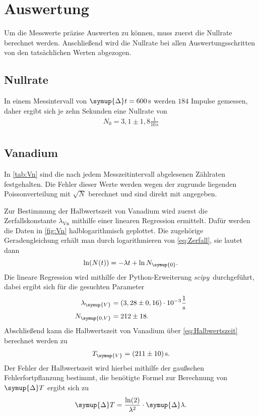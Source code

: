 \section{Auswertung}
\label{sec:Auswertung}

Um die Messwerte präzise Auswerten zu können, muss zuerst die Nullrate berechnet werden.
Anschließend wird die Nullrate bei allen Auswertungsschritten von den tatsächlichen Werten abgezogen.

\subsection{Nullrate}

In einem Messintervall von $\symup{\Delta}t=\qty{600}{\second}$ werden $184$ Impulse gemessen, daher
ergibt sich je zehn Sekunden eine Nullrate von
\begin{gather*}
    N_0=3,1\pm1,8 \frac{1}{10\,\unit{\second}} \\
\end{gather*}

\subsection{Vanadium}

In \autoref{tab:Vn} sind die nach jedem Messzeitintervall abgelesenen Zählraten festgehalten.
Die Fehler dieser Werte werden wegen der zugrunde liegenden Poissonverteilung mit $\sqrt{N}$ berechnet und sind
direkt mit angegeben.

Zur Bestimmung der Halbwertszeit von Vanadium wird zuerst die Zerfallskonstante $\lambda_\text{Vn}$ mithilfe einer linearen Regression
ermittelt.
Dafür werden die Daten in \autoref{fig:Vn} halblogarithmisch geplottet.
Die zugehörige Geradengleichung erhält man durch logarithmieren von \eqref{eq:Zerfall}, sie lautet dann
\begin{equation*}
  \ln(N(t)) = -\lambda t + \ln{N_{\symup{0}}}.
\end{equation*}
Die lineare Regression wird mithilfe der Python-Erweiterung \textit{scipy}\,\cite{scipy} durchgeführt, dabei
ergibt sich für die gesuchten Parameter
\begin{align*}
  \lambda_{\symup{V}} &= (3,28 \pm 0,16) \cdot 10^{-3} \unit{\per\second} \\
  N_{\symup{0, V}} &= 212 \pm 18.
\end{align*}
Abschließend kann die Halbwertszeit von Vanadium über \eqref{eq:Halbwertszeit} berechnet werden zu
\begin{gather*}
  T_{\symup{V}} = \qty{211+-10}{\second}.
\end{gather*}
Der Fehler der Halbwertszeit wird hierbei mithilfe der gaußschen Fehlerfortpflanzung bestimmt, die
benötigte Formel zur Berechnung von $\symup{\Delta}T$ ergibt sich zu
\begin{equation}
  \label{delta_t}
  \symup{\Delta}T = \frac{\ln(2)}{\lambda^2} \cdot \symup{\Delta} \lambda. 
\end{equation}

